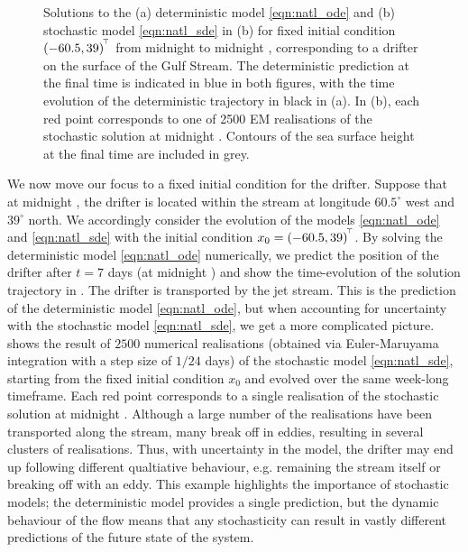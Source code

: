 \begin{figure}
\begin{center}
\begin{subfigure}[t]{0.7\textwidth}
			\label{fig:natl_stoch_rels}
		\end{subfigure}
		\caption{Solutions to the (a) deterministic model \cref{eqn:natl_ode} and (b) stochastic model \cref{eqn:natl_sde} in (b) for fixed initial condition \((-60.5, 39)^{^{\!\top}}\) from midnight  to midnight , corresponding to a drifter on the surface of the Gulf Stream.
			The deterministic prediction at the final time is indicated in blue in both figures, with the time evolution of the deterministic trajectory in black in (a).
			In (b), each red point corresponds to one of 2500 EM realisations of the stochastic solution at midnight .
			Contours of the sea surface height at the final time are included in grey.}
	\end{center}
\end{figure}


We now move our focus to a fixed initial condition for the drifter. %
Suppose that at midnight , the drifter is located within the stream at longitude \(60.5^\circ\) west and \(39^\circ\) north.
We accordingly consider the evolution of the models \cref{eqn:natl_ode} and \cref{eqn:natl_sde} with the initial condition \(x_0 = (-60.5, 39)^{^{\!\top}}\).
By solving the deterministic model \cref{eqn:natl_ode} numerically, we predict the position of the drifter after \(t = 7\) days (at midnight ) and show the time-evolution of the solution trajectory in .
The drifter is transported by the jet stream.
This is the prediction of the deterministic model \cref{eqn:natl_ode}, but when accounting for uncertainty with the stochastic model \cref{eqn:natl_sde}, we get a more complicated picture.
 shows the result of \(2500\) numerical realisations (obtained via Euler-Maruyama integration with a step size of \(1/24\) days) of the stochastic model \cref{eqn:natl_sde}, starting from the fixed initial condition \(x_0\) and evolved over the same week-long timeframe.
Each red point corresponds to a single realisation of the stochastic solution at midnight .
Although a large number of the realisations have been transported along the stream, many break off in eddies, resulting in several clusters of realisations.
Thus, with uncertainty in the model, the drifter may end up following different qualtiative behaviour, e.g. remaining the stream itself or breaking off with an eddy.
This example highlights the importance of stochastic models; the deterministic model provides a single prediction, but the dynamic behaviour of the flow means that any stochasticity can result in vastly different predictions of the future state of the system.

